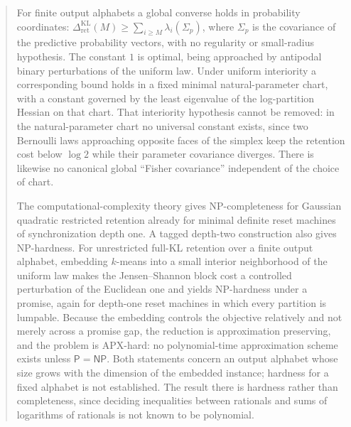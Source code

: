 \documentclass[12pt]{article}
\theoremstyle{definition}
\newcommand{\RetKL}{\Delta_{\mathrm{ret}}^{\mathrm{KL}}}
\begin{document}
\begin{abstract}
For finite output alphabets a global converse holds in probability
coordinates: $\RetKL(M)\ge\sum_{i\ge M}\lambda_i(\Sigma_p)$, where
$\Sigma_p$ is the covariance of the predictive probability vectors, with no
regularity or small-radius hypothesis.  The constant $1$ is optimal, being
approached by antipodal binary perturbations of the uniform law.  Under uniform
interiority a corresponding bound holds in a fixed minimal natural-parameter
chart, with a constant governed by the least eigenvalue of the log-partition
Hessian on that chart.  That interiority hypothesis cannot be removed: in the
natural-parameter chart no universal constant exists, since two Bernoulli laws
approaching opposite faces of the simplex keep the retention cost below
$\log2$ while their parameter covariance diverges.  There is likewise no
canonical global ``Fisher covariance'' independent of the choice of chart.

The computational-complexity theory gives NP-completeness for Gaussian
quadratic restricted retention already for minimal definite reset machines of
synchronization depth one.  A tagged depth-two construction also gives
NP-hardness.  For unrestricted full-KL retention over a finite output alphabet,
embedding $k$-means into a small interior neighborhood of the uniform law makes
the Jensen--Shannon block cost a controlled perturbation of the Euclidean one
and yields NP-hardness under a promise, again for depth-one reset machines in
which every partition is lumpable.  Because the embedding controls the
objective relatively and not merely across a promise gap, the reduction is
approximation preserving, and the problem is APX-hard: no polynomial-time
approximation scheme exists unless $\mathsf P=\mathsf{NP}$.  Both statements
concern an output alphabet whose size grows with the dimension of the embedded
instance; hardness for a fixed alphabet is not established.  The result there is
hardness rather than completeness, since deciding inequalities between
rationals and sums of logarithms of rationals is not known to be polynomial.


\end{abstract}
\end{document}
